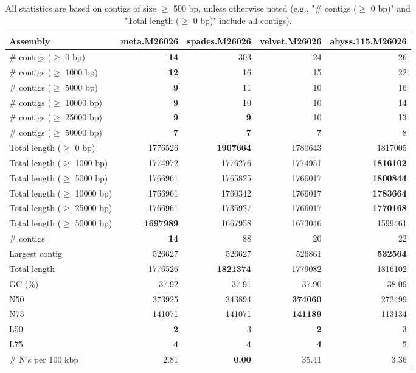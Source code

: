 \documentclass[12pt,a4paper]{article}
\begin{document}
\begin{table}[ht]
\begin{center}
\caption{All statistics are based on contigs of size $\geq$ 500 bp, unless otherwise noted (e.g., "\# contigs ($\geq$ 0 bp)" and "Total length ($\geq$ 0 bp)" include all contigs).}
\begin{tabular}{|l*{4}{|r}|}
\hline
Assembly & meta.M26026 & spades.M26026 & velvet.M26026 & abyss.115.M26026 \\ \hline
\# contigs ($\geq$ 0 bp) & {\bf 14} & 303 & 24 & 26 \\ \hline
\# contigs ($\geq$ 1000 bp) & {\bf 12} & 16 & 15 & 22 \\ \hline
\# contigs ($\geq$ 5000 bp) & {\bf 9} & 11 & 10 & 16 \\ \hline
\# contigs ($\geq$ 10000 bp) & {\bf 9} & 10 & 10 & 14 \\ \hline
\# contigs ($\geq$ 25000 bp) & {\bf 9} & {\bf 9} & 10 & 13 \\ \hline
\# contigs ($\geq$ 50000 bp) & {\bf 7} & {\bf 7} & {\bf 7} & 8 \\ \hline
Total length ($\geq$ 0 bp) & 1776526 & {\bf 1907664} & 1780643 & 1817005 \\ \hline
Total length ($\geq$ 1000 bp) & 1774972 & 1776276 & 1774951 & {\bf 1816102} \\ \hline
Total length ($\geq$ 5000 bp) & 1766961 & 1765825 & 1766017 & {\bf 1800844} \\ \hline
Total length ($\geq$ 10000 bp) & 1766961 & 1760342 & 1766017 & {\bf 1783664} \\ \hline
Total length ($\geq$ 25000 bp) & 1766961 & 1735927 & 1766017 & {\bf 1770168} \\ \hline
Total length ($\geq$ 50000 bp) & {\bf 1697989} & 1667958 & 1673046 & 1599461 \\ \hline
\# contigs & {\bf 14} & 88 & 20 & 22 \\ \hline
Largest contig & 526627 & 526627 & 526861 & {\bf 532564} \\ \hline
Total length & 1776526 & {\bf 1821374} & 1779082 & 1816102 \\ \hline
GC (\%) & 37.92 & 37.91 & 37.90 & 38.09 \\ \hline
N50 & 373925 & 343894 & {\bf 374060} & 272499 \\ \hline
N75 & 141071 & 141071 & {\bf 141189} & 113134 \\ \hline
L50 & {\bf 2} & 3 & {\bf 2} & 3 \\ \hline
L75 & {\bf 4} & {\bf 4} & {\bf 4} & 5 \\ \hline
\# N's per 100 kbp & 2.81 & {\bf 0.00} & 35.41 & 3.36 \\ \hline
\end{tabular}
\end{center}
\end{table}
\end{document}
